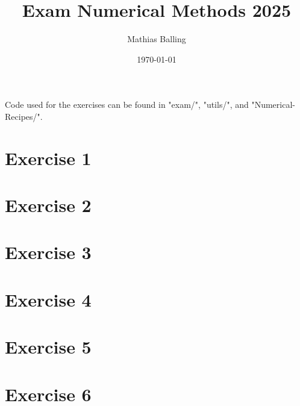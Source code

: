 \documentclass{article}
\title{Exam Numerical Methods 2025}
\author{Mathias Balling}
\date{\today}
\begin{document}
\maketitle

Code used for the exercises can be found in "exam/", "utils/", and "Numerical-Recipes/".
\section*{Exercise 1}
\section*{Exercise 2}
\section*{Exercise 3}
\section*{Exercise 4}
\section*{Exercise 5}
\section*{Exercise 6}


\end{document}
